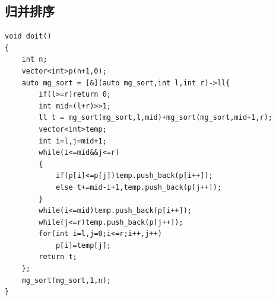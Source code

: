 \documentclass[12pt, a4paper, oneside]{ctexart}
\begin{document}
\subsection{归并排序} 
\begin{lstlisting}
void doit()
{
	int n;
	vector<int>p(n+1,0);
	auto mg_sort = [&](auto mg_sort,int l,int r)->ll{
		if(l>=r)return 0;
		int mid=(l+r)>>1;
		ll t = mg_sort(mg_sort,l,mid)+mg_sort(mg_sort,mid+1,r);
		vector<int>temp;
		int i=l,j=mid+1;
		while(i<=mid&&j<=r)
		{
			if(p[i]<=p[j])temp.push_back(p[i++]);
			else t+=mid-i+1,temp.push_back(p[j++]);
		}
		while(i<=mid)temp.push_back(p[i++]);
		while(j<=r)temp.push_back(p[j++]);
		for(int i=l,j=0;i<=r;i++,j++)
			p[i]=temp[j];
		return t;
	};
	mg_sort(mg_sort,1,n);
}
\end{lstlisting}



\newpage
\end{document}
